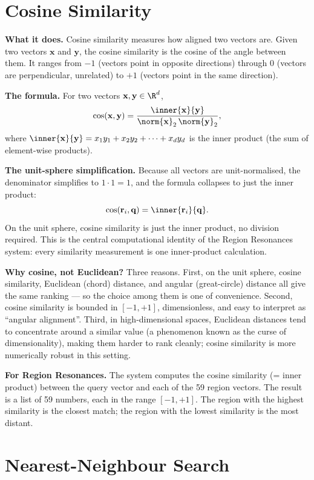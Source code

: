 \documentclass[11pt]{article}
\begin{document}
\section{Cosine Similarity}

\textbf{What it does.} Cosine similarity measures how aligned two vectors are. Given two vectors $\mathbf{x}$ and $\mathbf{y}$, the cosine similarity is the cosine of the angle between them. It ranges from $-1$ (vectors point in opposite directions) through $0$ (vectors are perpendicular, unrelated) to $+1$ (vectors point in the same direction).

\textbf{The formula.} For two vectors $\mathbf{x}, \mathbf{y} \in \R^d$,
\[
\cos(\mathbf{x}, \mathbf{y}) = \frac{\inner{\mathbf{x}}{\mathbf{y}}}{\norm{\mathbf{x}}_2 \, \norm{\mathbf{y}}_2},
\]
where $\inner{\mathbf{x}}{\mathbf{y}} = x_1 y_1 + x_2 y_2 + \cdots + x_d y_d$ is the inner product (the sum of element-wise products).

\textbf{The unit-sphere simplification.} Because all vectors are unit-normalised, the denominator simplifies to $1 \cdot 1 = 1$, and the formula collapses to just the inner product:
\[
\cos(\mathbf{r}_i, \mathbf{q}) = \inner{\mathbf{r}_i}{\mathbf{q}}.
\]
On the unit sphere, cosine similarity is just the inner product, no division required. This is the central computational identity of the Region Resonances system: every similarity measurement is one inner-product calculation.

\textbf{Why cosine, not Euclidean?} Three reasons. First, on the unit sphere, cosine similarity, Euclidean (chord) distance, and angular (great-circle) distance all give the same ranking --- so the choice among them is one of convenience. Second, cosine similarity is bounded in $[-1, +1]$, dimensionless, and easy to interpret as ``angular alignment''. Third, in high-dimensional spaces, Euclidean distances tend to concentrate around a similar value (a phenomenon known as the curse of dimensionality), making them harder to rank cleanly; cosine similarity is more numerically robust in this setting.

\textbf{For Region Resonances.} The system computes the cosine similarity (= inner product) between the query vector and each of the 59 region vectors. The result is a list of 59 numbers, each in the range $[-1, +1]$. The region with the highest similarity is the closest match; the region with the lowest similarity is the most distant.

\section{Nearest-Neighbour Search}
\end{document}
